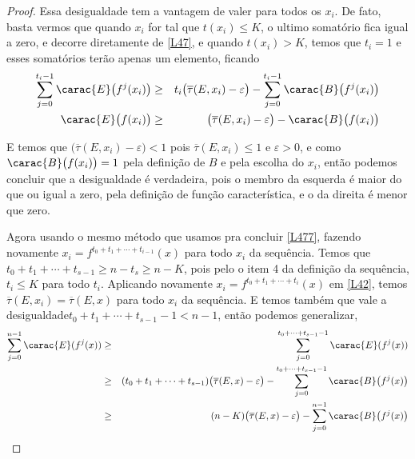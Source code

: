 \begin{proof}
Essa desigualdade tem a vantagem de valer para todos os $x_i$. De fato, basta vermos que quando $x_i$ for tal que $t(x_i)\leq K$, o ultimo somatório fica igual a zero, e decorre diretamente de \eqref{L47}, e quando $t(x_i)> K$, temos que $t_{i}=1$ e esses somatórios terão apenas um elemento, ficando
\begin{eqnarray*}
\sum_{j=0}^{t_i-1}\carac{E}\big(f^j(x_i)\big) & \geq & t_i\big(\overline{\tau}(E,x_i)-\varepsilon\big)-\sum_{j=0}^{t_i-1}\carac{B}\big(f^j(x_i)\big)\\
\carac{E}\big(f(x_i)\big) & \geq & \big(\overline{\tau}(E,x_i)-\varepsilon\big)-\carac{B}\big(f(x_i)\big)
\end{eqnarray*}

E temos que $\big(\overline{\tau}(E,x_i)-\varepsilon\big)<1$ pois $\overline{\tau}(E,x_i)\leq1$ e $\varepsilon>0$, e como $\carac{B}\big(f(x_i)\big)=1$ pela definição de $B$ e pela escolha do $x_i$, então podemos concluir que a desigualdade é verdadeira, pois o membro da esquerda é maior do que ou igual a zero, pela definição de função característica, e o da direita é menor que zero.

Agora usando o mesmo método que usamos pra concluir \eqref{L477}, fazendo novamente $x_i = f^{t_0+t_1+\cdots+t_{i-1}}(x)$ para todo $x_i$ da sequência. Temos que $t_0+t_1+\cdots+t_{s-1}\geq n-t_s \geq n-K$, pois pelo o item 4 da definição da sequência, $t_i\leq K$ para todo $t_i$. Aplicando novamente $x_i=f^{t_0+t_1+\cdots+t_{i}}(x)$ em \eqref{L42}, temos $\overline{\tau}(E,x_i)=\overline{\tau}(E,x)$ para todo $x_i$ da sequência. E temos também que vale a desigualdade$t_0+t_1+\cdots+t_{s-1}-1< n-1$, então podemos generalizar,
\begin{eqnarray*}
\sum_{j=0}^{n-1}\carac{E}(f^j(x)) & \geq & \sum_{j=0}^{t_0+\cdots+t_{s-1}-1}\carac{E}(f^j(x))\nonumber\\
 & \geq & (t_0+t_1+\cdots+t_{s-1})\big(\overline{\tau}(E,x)-\varepsilon\big)-\sum_{j=0}^{t_0+\cdots+t_{s-1}-1}\carac{B}\big(f^j(x)\big)\\
 & \geq & (n-K)\big(\overline{\tau}(E,x)-\varepsilon\big)-\sum_{j=0}^{n-1}\carac{B}\big(f^j(x)\big)\\
\end{eqnarray*}





\end{proof}
